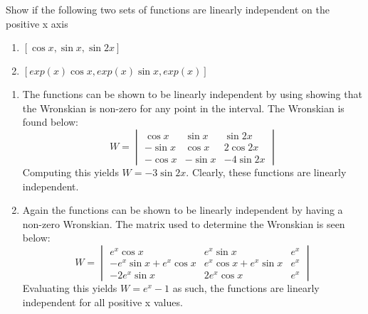 Show if the following two sets of functions are linearly independent on the positive x axis
\begin{enumerate}
	\item $\left[\cos x, \sin x, \sin 2x\right]$
	\item $\left[exp(x)\cos x, exp(x)\sin x, exp(x)\right]$
\end{enumerate}

\begin{enumerate}
	\item The functions can be shown to be linearly independent by using showing that the Wronskian is non-zero for any point in the interval. The Wronskian is found below:
	\begin{equation*}W=
	\begin{vmatrix}
		\cos x & \sin x & \sin 2x \\ -\sin x & \cos x & 2\cos 2x \\ -\cos x & -\sin x & -4\sin 2x
	\end{vmatrix}
	\end{equation*}
	Computing this yields $W=-3 \sin 2x$. Clearly, these functions are linearly independent.
	
	\item Again the functions can be shown to be linearly independent by having a non-zero Wronskian.
	The matrix used to determine the Wronskian is seen below:
		\begin{equation*}W=
	\begin{vmatrix}
		e^x\cos x & e^x\sin x & e^x \\ -e^x\sin x+e^x\cos x & e^x\cos x+e^x\sin x &e^x \\ -2e^x\sin x & 2e^x\cos x & e^x
	\end{vmatrix}
	\end{equation*}
	Evaluating this yields $W=e^x-1$ as such, the functions are linearly independent for all positive x values.
\end{enumerate}